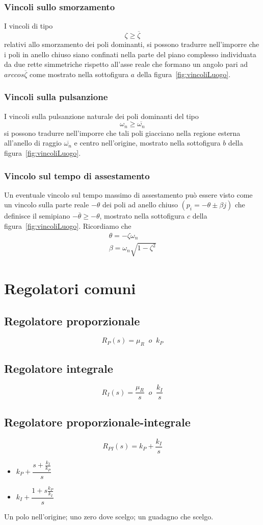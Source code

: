 \documentclass[a4paper]{report}
\begin{document}
\subsection{Vincoli sullo smorzamento}
I vincoli di tipo
\[
\zeta \geq \overline{\zeta}
\]
relativi allo smorzamento dei poli dominanti, si possono tradurre
nell'imporre che i poli in anello chiuso siano confinati nella parte
del piano complesso individuata da due rette simmetriche rispetto
all'asse reale che formano un angolo pari ad $arccos
\overline{\zeta}$ come mostrato nella sottofigura $a$ della
figura~\ref{fig:vincoliLuogo}.
\subsection{Vincoli sulla pulsanzione}
I vincoli sulla pulsanzione naturale dei poli dominanti del tipo
\[
\omega_n \geq \overline{\omega_n}
\]
si possono tradurre nell'imporre che tali poli giacciano nella regione
esterna all'anello di raggio $\overline{\omega_n}$ e centro
nell'origine, mostrato nella sottofigura $b$ della
figura~\ref{fig:vincoliLuogo}.
\subsection{Vincolo sul tempo di assestamento}
Un eventuale vincolo sul tempo massimo di assestamento pu\`o essere
visto come un vincolo sulla parte reale $-\theta$ dei poli ad anello
chiuso $(p_i = - \theta \pm \beta j)$ che definisce il semipiano
$- \overline{\theta} \geq - \theta$, mostrato nella sottofigura $c$ della
figura~\ref{fig:vincoliLuogo}. Ricordiamo che
\[
\begin{array}{l}
  \theta = - \zeta \omega_n\\
  \beta = \omega_n \sqrt{1 - \zeta^2}
\end{array}
\]
\chapter{Regolatori comuni}
\section{Regolatore proporzionale}
\[
R_P(s) = \mu_R \;\;o\;\; k_P
\]
\section{Regolatore integrale}
\[
R_I(s) = \dfrac{\mu_R}{s} \;\;o\;\; \dfrac{k_I}{s}
\]
\section{Regolatore proporzionale-integrale}
\[
R_{PI}(s) = k_P + \dfrac{k_I}{s}
\]
\begin{itemize}
\item $k_P + \dfrac{s + \frac{k_I}{k_P}}{s}$
\item $k_I + \dfrac{1 + s\frac{k_P}{k_I}}{s}$
\end{itemize}
Un polo nell'origine; uno zero dove scelgo; un guadagno che scelgo.
\end{document}
